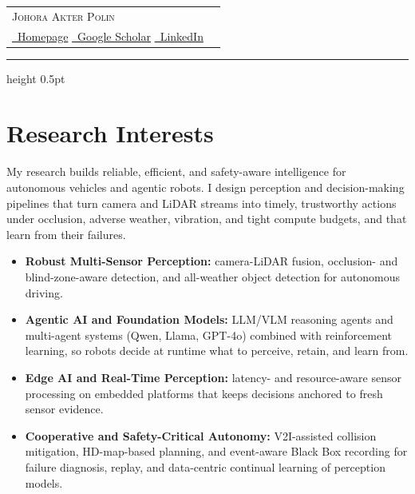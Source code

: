 \documentclass[11pt,letterpaper]{article}
\makeatletter
\newcommand{\scholaricon}{\faGraduationCap}   %
\newcommand{\scholaricon}{\aiGoogleScholar}
\newlength{\cvlabelwidth}\setlength{\cvlabelwidth}{1.15in}
\newlength{\cvlabelsep}\setlength{\cvlabelsep}{0.2in}
\newcommand{\cvheader}{%
  \noindent\hspace*{-\dimexpr\cvlabelwidth+\cvlabelsep\relax}%
  \begin{minipage}[b]{\dimexpr\textwidth+\cvlabelwidth+\cvlabelsep\relax}
    \begin{tabular*}{\linewidth}{@{}l@{\extracolsep{\fill}}r@{}}
      {\fontsize{25}{30}\selectfont\scshape Johora Akter Polin} &
      {\small\begin{tabular}[b]{@{}r@{}}
        \href{tel:+17573711873}{\faPhone\ +1 (757) 371-1873}%
        \enspace\textbar\textbar\enspace
        \href{mailto:japolin@wm.edu}{\faEnvelope\ japolin@wm.edu}\\
        \href{https://roboworld314.github.io/japolin.org/}{\faGlobe\ Homepage}%
        \enspace\textbar\textbar\enspace
        \href{https://scholar.google.com/citations?user=50AFRskAAAAJ}{\scholaricon\ Google Scholar}%
        \enspace\textbar\textbar\enspace
        \href{https://www.linkedin.com/in/johora-akter-polin-577759232/}{\faLinkedin\ LinkedIn}
      \end{tabular}}
    \end{tabular*}\par
    \vspace{5pt}\hrule height 0.5pt
  \end{minipage}\par
  \vspace{2pt}}
\makeatother
\begin{document}
\cvheader

\section{Research Interests}
My research builds reliable, efficient, and safety-aware intelligence for
autonomous vehicles and agentic robots. I design perception and
decision-making pipelines that turn camera and LiDAR streams into
timely, trustworthy actions under occlusion, adverse weather, vibration, and
tight compute budgets, and that learn from their failures.
\begin{itemize}[topsep=4pt]
  \item \textbf{Robust Multi-Sensor Perception:} camera-LiDAR fusion,
        occlusion- and blind-zone-aware detection, and all-weather object
        detection for autonomous driving.
  \item \textbf{Agentic AI and Foundation Models:} LLM/VLM reasoning agents
        and multi-agent systems (Qwen, Llama, GPT-4o) combined with
        reinforcement learning, so robots decide at runtime what to perceive,
        retain, and learn from.
  \item \textbf{Edge AI and Real-Time Perception:} latency- and resource-aware
        sensor processing on embedded platforms that keeps decisions anchored
        to fresh sensor evidence.
  \item \textbf{Cooperative and Safety-Critical Autonomy:} V2I-assisted
        collision mitigation, HD-map-based planning, and event-aware Black Box
        recording for failure diagnosis, replay, and data-centric continual learning
        of perception models.
\end{itemize}

\end{document}
